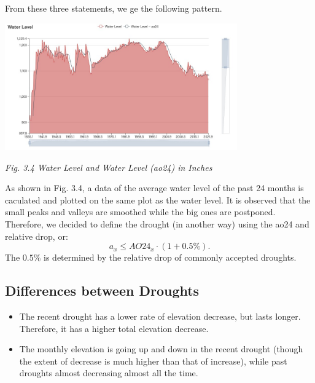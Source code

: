 \documentclass[12pt]{article}
\theoremstyle{definition}
\theoremstyle{remark}
\numberwithin{equation}{section}
\begin{document}
		From these three statements, we ge the following pattern.
		
		\begin{center}
		\includegraphics[width=10cm]{3.4 Water Level and Water Level (ao24) in Inches.jpg}

		\textit{Fig. 3.4 Water Level and Water Level (ao24) in Inches}
		\end{center}
		
		As shown in Fig. 3.4, a data of the average water level of the past 24 months is caculated and plotted on the same plot 
		as the water level. It is observed that the small peaks and valleys are smoothed while the big ones are postponed. Therefore,
		we decided to define the drought (in another way) using the ao24 and relative drop, or:
		$$
		a_x\leq AO24_x \cdot (1+0.5\%).
		$$
		The $0.5\%$ is determined by the relative drop of commonly accepted droughts.


	\subsection{Differences between Droughts}
		\begin{itemize}
			\item The recent drought has a lower rate of elevation decrease, but lasts longer. Therefore, it has a higher total elevation
			decrease.
			\item The monthly elevation is going up and down in the recent drought (though the extent of decrease is much higher 
			than that of increase), while past droughts almost decreasing almost all the time. 
		\end{itemize}
\end{document}
